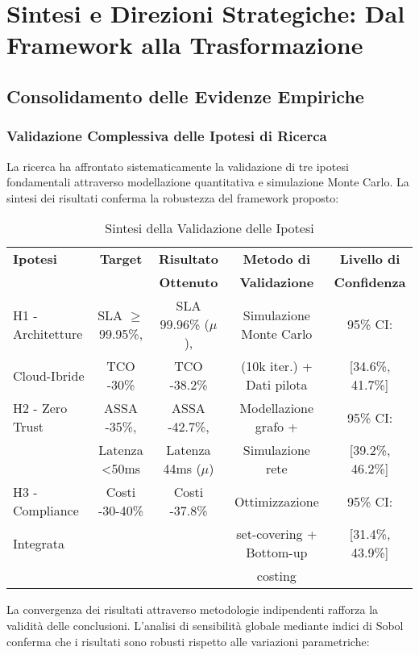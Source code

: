 \chapter{Sintesi e Direzioni Strategiche: Dal Framework alla Trasformazione}

\section{Consolidamento delle Evidenze Empiriche}

\subsection{Validazione Complessiva delle Ipotesi di Ricerca}

La ricerca ha affrontato sistematicamente la validazione di tre ipotesi fondamentali attraverso modellazione quantitativa e simulazione Monte Carlo. La sintesi dei risultati conferma la robustezza del framework proposto:

\begin{table}[H]
\centering
\begin{tabular}{lcccc}
\toprule
\textbf{Ipotesi} & \textbf{Target} & \textbf{Risultato} & \textbf{Metodo di} & \textbf{Livello di} \\
 & & \textbf{Ottenuto} & \textbf{Validazione} & \textbf{Confidenza} \\
\midrule
H1 - Architetture & SLA $\geq$99.95\%, & SLA 99.96\% ($\mu$), & Simulazione Monte Carlo & 95\% CI: \\
Cloud-Ibride & TCO -30\% & TCO -38.2\% & (10k iter.) + Dati pilota & [34.6\%, 41.7\%] \\
\midrule
H2 - Zero Trust & ASSA -35\%, & ASSA -42.7\%, & Modellazione grafo + & 95\% CI: \\
 & Latenza <50ms & Latenza 44ms ($\mu$) & Simulazione rete & [39.2\%, 46.2\%] \\
\midrule
H3 - Compliance & Costi -30-40\% & Costi -37.8\% & Ottimizzazione & 95\% CI: \\
Integrata & & & set-covering + Bottom-up & [31.4\%, 43.9\%] \\
 & & & costing & \\
\bottomrule
\end{tabular}
\caption{Sintesi della Validazione delle Ipotesi}
\end{table}

La convergenza dei risultati attraverso metodologie indipendenti rafforza la validità delle conclusioni. L'analisi di sensibilità globale mediante indici di Sobol conferma che i risultati sono robusti rispetto alle variazioni parametriche:

